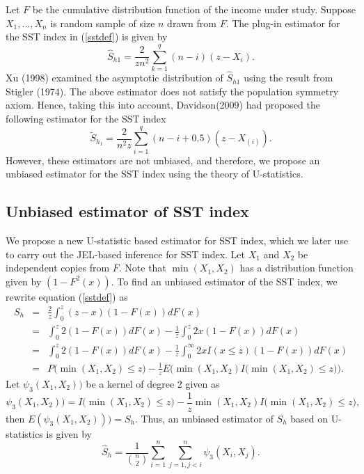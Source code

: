 \documentclass[11pt]{article}
\begin{document}
Let $F$ be the cumulative distribution function of the income under study. Suppose  $X_1,\ldots,X_n$ is random sample of size $n$ drawn from $F$.
The plug-in estimator for the SST index in (\ref{sstdef}) is given by
\begin{equation*}\label{sstemp}
\widehat S_{h1}=\frac{2}{zn^2}\sum_{k=1}^{q}(n-i)(z-X_{i}).
\end{equation*}
Xu (1998) examined the asymptotic distribution of $\widehat S_{h1}$ using the result from Stigler (1974).
The above estimator does not satisfy the population symmetry axiom. Hence, taking this into account,  Davidson(2009) had proposed the following estimator for the SST index
 \begin{equation}\label{qw}
   \tilde{S}_{h_{1}}=\frac{2}{n^{2}z}\sum_{i=1}^{q}(n-i+0.5)(z-X_{(i)}).
 \end{equation}
However, these estimators are not unbiased, and  therefore, we propose an unbiased estimator for the SST index using the theory of U-statistics.


\subsection{Unbiased estimator of SST index}

We propose a new U-statistic based estimator for SST index, which we later use to carry out  the JEL-based inference for SST index. Let $X_1$ and $X_2$ be independent copies from $F$.  Note that $\min(X_1,X_2)$ has a distribution function given by $(1-F^2(x))$.  To find an unbiased estimator of the SST index, we rewrite  equation (\ref{sstdef}) as
\begin{eqnarray*}
S_{h}&=& \frac{2}{z}\int_{0}^{z}(z-x)(1-F(x))dF(x)\\
&=&\int_{0}^{z}2(1-F(x))dF(x)-\frac{1}{z}\int_{0}^{z}2x(1-F(x))dF(x)\\
&=&\int_{0}^{z}2(1-F(x))dF(x)-\frac{1}{z}\int_{0}^{\infty}2xI(x\le z)(1-F(x))dF(x)\\
&=&P\big(\min(X_1,X_2) \le z\big)-\frac{1}{z}E\big(\min(X_1,X_2)I\big(\min(X_1,X_2) \le z\big)\big).
\end{eqnarray*}
Let  $\psi_3(X_1,X_2))$ be a kernel of degree 2 given as
\begin{equation*}
\psi_3(X_1,X_2))=I\big(\min(X_1,X_2) \le z\big)-\frac{1}{z}\min(X_1,X_2)I\big(\min(X_1,X_2) \le z\big),
\end{equation*}
then $E(\psi_3(X_1,X_2))) = S_h$.  Thus, an unbiased  estimator of $S_{h}$ based on  U-statistics is given by
\begin{equation}\label{23}
\widehat{S}_h=\frac{1}{\binom{n}{2}}\sum_{i=1}^{n}\sum_{j=1,j<i}^{n}\psi_3(X_i,X_j).
\end{equation}
\end{document}
